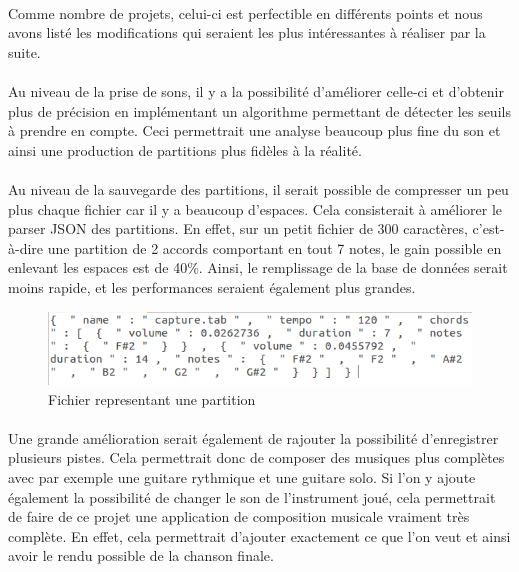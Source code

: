 \paragraph{}
Comme nombre de projets, celui-ci est perfectible en différents points et nous avons listé les modifications qui seraient les plus intéressantes à réaliser par la suite.  

\paragraph{}
Au niveau de la prise de sons, il y a la possibilité d'améliorer celle-ci et d'obtenir plus de précision 
en implémentant un algorithme permettant de détecter les seuils à prendre en compte. Ceci permettrait une analyse beaucoup plus fine du son et ainsi une production de partitions plus fidèles à la réalité.

\paragraph{}
Au niveau de la sauvegarde des partitions, il serait possible de compresser un peu plus chaque fichier 
car il y a beaucoup d'espaces. Cela consisterait à améliorer le parser JSON des partitions. En effet, sur un petit fichier 
de 300 caractères, c'est-à-dire une partition de 2 accords comportant en tout 7 notes, le gain 
possible en enlevant les espaces est de 40\%. Ainsi, le remplissage de la base de données serait moins rapide, 
et les performances seraient également plus grandes.

\begin{figure}[H]
\centering
\includegraphics[scale=0.5]{FichierPartition}
\caption{Fichier representant une partition}
\end{figure}


\paragraph{}
Une grande amélioration serait également de rajouter la possibilité d'enregistrer plusieurs pistes. Cela permettrait donc de 
composer des musiques plus complètes avec par exemple une guitare rythmique et une guitare solo. Si l'on y ajoute également 
la possibilité de changer le son de l'instrument joué, cela permettrait de faire de ce projet une application de 
composition musicale vraiment très complète. En effet, cela permettrait d'ajouter exactement ce que l'on veut et ainsi 
avoir le rendu possible de la chanson finale.

